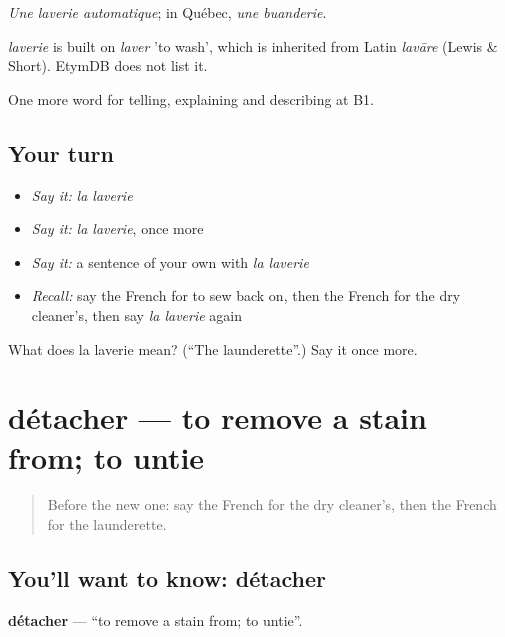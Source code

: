 \emph{Une laverie automatique}; in Québec, \emph{une buanderie}.

\begin{cousinweb}
\emph{laverie} is built on \emph{laver} 'to wash', which is inherited from Latin \emph{lavāre} (Lewis \& Short). EtymDB does not list it.
\end{cousinweb}

\begin{grammarlens}[title={What you've built}]
One more word for telling, explaining and describing at B1.
\end{grammarlens}

\subsection*{Your turn}
\begin{itemize}
\raggedright
  \item \emph{Say it:} \emph{la laverie}
  \item \emph{Say it:} \emph{la laverie}, once more
  \item \emph{Say it:} a sentence of your own with \emph{la laverie}
  \item \emph{Recall:} say the French for to sew back on, then the French for the dry cleaner’s, then say \emph{la laverie} again
\end{itemize}

\begin{tcolorbox}[breakable,colback=teal!4,colframe=teal!35!black,title={Before you move on}]
What does la laverie mean? (\textquotedblleft{}The launderette\textquotedblright{}.) Say it once more.
\end{tcolorbox}
\section[détacher]{détacher — to remove a stain from; to untie}

\label{lesson:FR-C447-detacher}



\begin{quote}
Before the new one: say the French for the dry cleaner’s, then the French for the launderette.
\end{quote}

\subsection*{You'll want to know: détacher}
\textbf{détacher} — \textquotedblleft{}to remove a stain from; to untie\textquotedblright{}.

